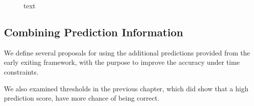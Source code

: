 \begin{figure}
	\centering
	\hfill
	\caption[short text]{text}
	\label{fig:exit-highscore}
\end{figure}

\subsection{Combining Prediction Information}

We define several proposals for using the additional predictions provided from the early exiting framework, with the purpose to improve the accuracy under time constraints. 




We also examined thresholds in the previous chapter, which did show that a high prediction score, have more chance of being correct.       

